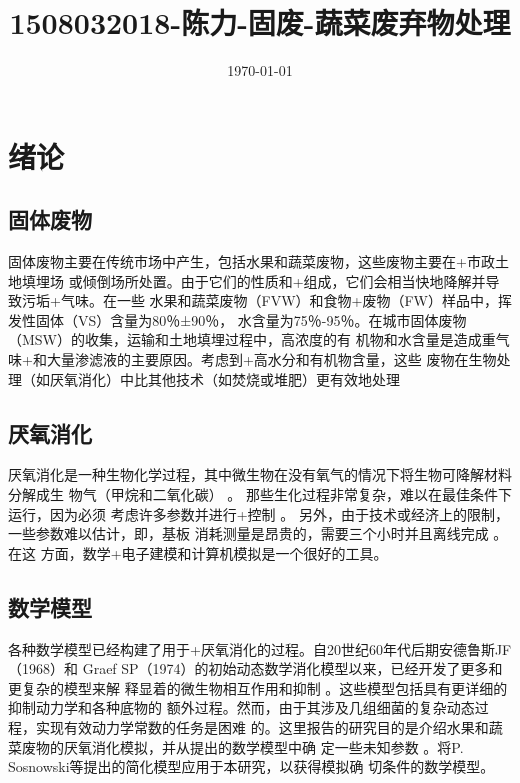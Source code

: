 \documentclass[11pt]{article}
\date{\today}
\title{1508032018-陈力-固废-蔬菜废弃物处理}
\begin{document}
\maketitle
\tableofcontents



\section{绪论}
\label{sec:org7eed804}
\subsection{固体废物}
\label{sec:org7b09ac6}
固体废物主要在传统市场中产生，包括水果和蔬菜废物，这些废物主要在+市政土地填埋场
或倾倒场所处置。由于它们的性质和+组成，它们会相当快地降解并导致污垢+气味。在一些
水果和蔬菜废物（FVW）和食物+废物（FW）样品中，挥发性固体（VS）含量为80％±90％，
水含量为75％-95％。在城市固体废物（MSW）的收集，运输和土地填埋过程中，高浓度的有
机物和水含量是造成重气味+和大量渗滤液的主要原因。考虑到+高水分和有机物含量，这些
废物在生物处理（如厌氧消化）中比其他技术（如焚烧或堆肥）更有效地处理\cite{sitorus13_biogas_recov_from_anaer_diges}

\subsection{厌氧消化}
\label{sec:orgf727788}
厌氧消化是一种生物化学过程，其中微生物在没有氧气的情况下将生物可降解材料分解成生
物气（甲烷和二氧化碳）\cite{84_biogas_produc_utiliz} 。 那些生化过程非常复杂，难以在最佳条件下运行，因为必须
考虑许多参数并进行+控制\cite{deublein10_biogas_waste_renew_resour} 。 另外，由于技术或经济上的限制，一些参数难以估计，即，基板
消耗测量是昂贵的，需要三个小时并且离线完成\cite{carlos-hernandez09_fuzzy_obser_anaer_wwtp} 。在这
方面，数学+电子建模和计算机模拟是一个很好的工具。

\subsection{数学模型}
\label{sec:org6ccd5cf}
各种数学模型已经构建了用于+厌氧消化的过程。自20世纪60年代后期安德鲁斯JF（1968）和
Graef SP（1974）的初始动态数学消化模型以来，已经开发了更多和更复杂的模型来解
释显着的微生物相互作用和抑制\cite{yu13_mathem_model_anaer_diges_ad} 。这些模型包括具有更详细的抑制动力学和各种底物的
额外过程。然而，由于其涉及几组细菌的复杂动态过程，实现有效动力学常数的任务是困难
的。这里报告的研究目的是介绍水果和蔬菜废物的厌氧消化模拟，并从提出的数学模型中确
定一些未知参数\cite{donoso-bravo11_model_selec_ident_valid_anaer_diges} 。将P. Sosnowski等提出的简化模型应用于本研究，以获得模拟确
切条件的数学模型。
\end{document}
